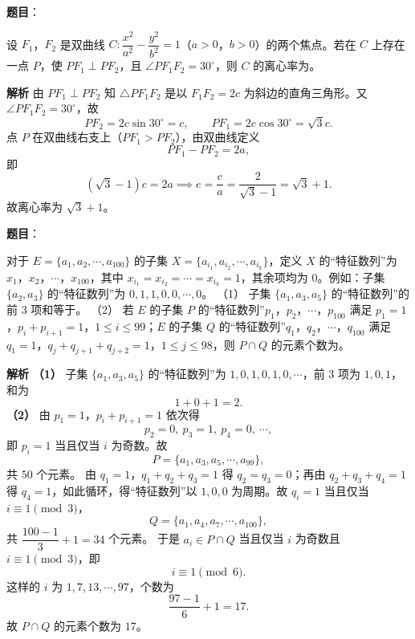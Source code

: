 \begin{answer}

\textbf{题目}：

设 $F_1$，$F_2$ 是双曲线 $C:\dfrac{x^2}{a^2}-\dfrac{y^2}{b^2}=1$（$a>0$，$b>0$）的两个焦点。若在 $C$ 上存在一点 $P$，使 $PF_1\perp PF_2$，且 $\angle PF_1F_2=30^\circ$，则 $C$ 的离心率为\gkblank{}。

\textbf{解析}
由 $PF_1\perp PF_2$ 知 $\triangle PF_1F_2$ 是以 $F_1F_2=2c$ 为斜边的直角三角形。又 $\angle PF_1F_2=30^\circ$，故
\nopagebreak[4]
\[PF_2=2c\sin30^\circ=c,\qquad PF_1=2c\cos30^\circ=\sqrt3c.\]
点 $P$ 在双曲线右支上（$PF_1>PF_2$），由双曲线定义
\nopagebreak[4]
\[PF_1-PF_2=2a,\]
即
\nopagebreak[4]
\[(\sqrt3-1)c=2a\implies e=\frac ca=\frac2{\sqrt3-1}=\sqrt3+1.\]
故离心率为 $\sqrt3+1$。


\end{answer}
\begin{answer}

\textbf{题目}：

对于 $E=\{a_1,a_2,\cdots,a_{100}\}$ 的子集 $X=\{a_{i_1},a_{i_2},\cdots,a_{i_k}\}$，定义 $X$ 的“特征数列”为 $x_1$，$x_2$，$\cdots$，$x_{100}$，其中 $x_{i_1}=x_{i_2}=\cdots=x_{i_k}=1$，其余项均为 $0$。例如：子集 $\{a_2,a_3\}$ 的“特征数列”为 $0,1,1,0,0,\cdots,0$。
（1） 子集 $\{a_1,a_3,a_5\}$ 的“特征数列”的前 $3$ 项和等于\gkblank{}。
（2） 若 $E$ 的子集 $P$ 的“特征数列”$p_1$，$p_2$，$\cdots$，$p_{100}$ 满足 $p_1=1$，$p_i+p_{i+1}=1$，$1\leqslant i\leqslant99$；$E$ 的子集 $Q$ 的“特征数列”$q_1$，$q_2$，$\cdots$，$q_{100}$ 满足 $q_1=1$，$q_j+q_{j+1}+q_{j+2}=1$，$1\leqslant j\leqslant98$，则 $P\cap Q$ 的元素个数为\gkblank{}。

\textbf{解析}
\textbf{（1）} 子集 $\{a_1,a_3,a_5\}$ 的“特征数列”为 $1,0,1,0,1,0,\cdots$，前 $3$ 项为 $1,0,1$，和为
\nopagebreak[4]
\[1+0+1=2.\]
\textbf{（2）} 由 $p_1=1$，$p_i+p_{i+1}=1$ 依次得
\nopagebreak[4]
\[p_2=0,\ p_3=1,\ p_4=0,\ \cdots,\]
即 $p_i=1$ 当且仅当 $i$ 为奇数。故
\nopagebreak[4]
\[P=\{a_1,a_3,a_5,\cdots,a_{99}\},\]
共 $50$ 个元素。
由 $q_1=1$，$q_1+q_2+q_3=1$ 得 $q_2=q_3=0$；再由 $q_2+q_3+q_4=1$ 得 $q_4=1$，如此循环，得“特征数列”以 $1,0,0$ 为周期。故 $q_i=1$ 当且仅当 $i\equiv1\pmod 3$，
\nopagebreak[4]
\[Q=\{a_1,a_4,a_7,\cdots,a_{100}\},\]
共 $\dfrac{100-1}3+1=34$ 个元素。
于是 $a_i\in P\cap Q$ 当且仅当 $i$ 为奇数且 $i\equiv1\pmod3$，即
\nopagebreak[4]
\[i\equiv1\pmod6.\]
这样的 $i$ 为 $1,7,13,\cdots,97$，个数为
\nopagebreak[4]
\[\frac{97-1}6+1=17.\]
故 $P\cap Q$ 的元素个数为 $17$。



\end{answer}
